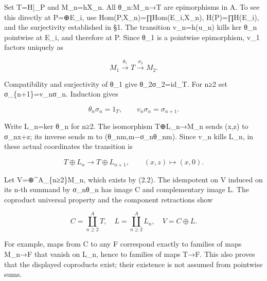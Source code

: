 Set T\allowbreak{}=H|\_\allowbreak{}P and M\_\allowbreak{}n\allowbreak{}=hX\_\allowbreak{}n. All θ\_\allowbreak{}n:\allowbreak{}M\_\allowbreak{}n\allowbreak{}→T are epimorphisms in A. To see this directly at P\allowbreak{}=\allowbreak{}⊕E\_\allowbreak{}i,\allowbreak{} use Hom(P,\allowbreak{}X\_\allowbreak{}n)\allowbreak{}\allowbreak{}=∏Hom(E\_\allowbreak{}i,\allowbreak{}X\_\allowbreak{}n)\allowbreak{},\allowbreak{} H(P)\allowbreak{}\allowbreak{}=∏H(E\_\allowbreak{}i)\allowbreak{},\allowbreak{} and the surjectivity established in §1. The transition v\_\allowbreak{}n\allowbreak{}=h(u\_\allowbreak{}n)\allowbreak{} kills ker θ\_\allowbreak{}n pointwise at E\_\allowbreak{}i,\allowbreak{} and therefore at P. Since θ\_\allowbreak{}1 is a pointwise epimorphism,\allowbreak{} v\_\allowbreak{}1 factors uniquely as

\[
 M_1\xrightarrow{\theta_1}T\xrightarrow{\sigma_2}M_2.
\]

Compatibility and surjectivity of θ\_\allowbreak{}1 give θ\_\allowbreak{}2σ\_\allowbreak{}2\allowbreak{}=id\_\allowbreak{}T. For n≥2 set σ\_\allowbreak{}\{n\allowbreak{}+1\}\allowbreak{}=v\_\allowbreak{}nσ\_\allowbreak{}n. Induction gives

\[
 \theta_n\sigma_n=1_T,\qquad v_n\sigma_n=\sigma_{n+1}.
\]

Write L\_\allowbreak{}n\allowbreak{}=ker θ\_\allowbreak{}n for n≥2. The isomorphism T\allowbreak{}⊕L\_\allowbreak{}n\allowbreak{}→M\_\allowbreak{}n sends (x,\allowbreak{}z)\allowbreak{} to σ\_\allowbreak{}nx\allowbreak{}+z; its inverse sends m to (θ\_\allowbreak{}nm,\allowbreak{}m−σ\_\allowbreak{}nθ\_\allowbreak{}nm)\allowbreak{}. Since v\_\allowbreak{}n kills L\_\allowbreak{}n,\allowbreak{} in these actual coordinates the transition is

\[
 T\oplus L_n\longrightarrow T\oplus L_{n+1},
       \qquad (x,z)\longmapsto(x,0). \tag{3.1}
\]

Let V\allowbreak{}=\allowbreak{}⊕\textasciicircum{}A\_\allowbreak{}\{n≥2\}M\_\allowbreak{}n,\allowbreak{} which exists by (2.2)\allowbreak{}. The idempotent on V induced on its n-th summand by σ\_\allowbreak{}nθ\_\allowbreak{}n has image C and complementary image L. The coproduct universal property and the component retractions show

\[
 C=\coprod_{n\ge2}^{A}T,\quad
 L=\coprod_{n\ge2}^{A}L_n,\quad V=C\oplus L.
\]

For example,\allowbreak{} maps from C to any F correspond exactly to families of maps M\_\allowbreak{}n\allowbreak{}→F that vanish on L\_\allowbreak{}n,\allowbreak{} hence to families of maps T\allowbreak{}→F. This also proves that the displayed coproducts exist; their existence is not assumed from pointwise sums.

